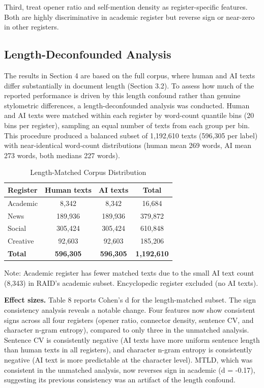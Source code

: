 \documentclass{article}
\begin{document}
Third, treat opener ratio and self-mention density as register-specific features. Both are highly discriminative in academic register but reverse sign or near-zero in other registers.

\subsection{Length-Deconfounded Analysis}

The results in Section 4 are based on the full corpus, where human and AI texts differ substantially in document length (Section 3.2). To assess how much of the reported performance is driven by this length confound rather than genuine stylometric differences, a length-deconfounded analysis was conducted. Human and AI texts were matched within each register by word-count quantile bins (20 bins per register), sampling an equal number of texts from each group per bin. This procedure produced a balanced subset of 1,192,610 texts (596,305 per label) with near-identical word-count distributions (human mean 269 words, AI mean 273 words, both medians 227 words).


\begin{table}[H]
\centering
\small
\begin{tabular}{lccc}
\toprule
\textbf{Register} & \textbf{Human texts} & \textbf{AI texts} & \textbf{Total} \\
\midrule
Academic & 8,342 & 8,342 & 16,684 \\
News & 189,936 & 189,936 & 379,872 \\
Social & 305,424 & 305,424 & 610,848 \\
Creative & 92,603 & 92,603 & 185,206 \\
\textbf{Total} & \textbf{596,305} & \textbf{596,305} & \textbf{1,192,610} \\
\bottomrule
\end{tabular}
\caption{Length-Matched Corpus Distribution}
\end{table}

Note: Academic register has fewer matched texts due to the small AI text count (8,343) in RAID's academic subset. Encyclopedic register excluded (no AI texts).

\textbf{Effect sizes.} Table 8 reports Cohen's d for the length-matched subset. The sign consistency analysis reveals a notable change. Four features now show consistent signs across all four registers (opener ratio, connector density, sentence CV, and character n-gram entropy), compared to only three in the unmatched analysis. Sentence CV is consistently negative (AI texts have more uniform sentence length than human texts in all registers), and character n-gram entropy is consistently negative (AI text is more predictable at the character level). MTLD, which was consistent in the unmatched analysis, now reverses sign in academic (d = -0.17), suggesting its previous consistency was an artifact of the length confound.
\end{document}
